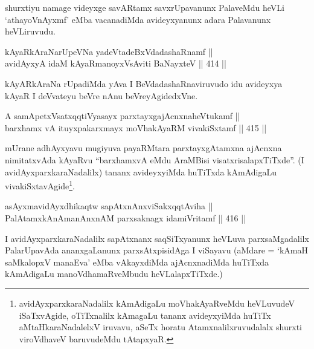 \begin{artha}
shurxtiyu namage videyxge savARtamx savxrUpavanunx PalaveMdu
heVLi `athayoV\s nAyxmf' eMba vacanadiMda avideyxyanunx adara Palavanunx
heVLiruvudu.
\end{artha}


\begin{shl}
kAyaRkAraNarUpeVNa yadeVtadeBxVdadashaRnamf || \\
avidAyxyA idaM kAyaRmanoyxV\s sAviti BaNayxteV \hfill || 414 ||  
\end{shl}

\begin{artha}
kAyARkAraNa rUpadiMda yAva I BeVdadashaRnaviruvudo idu avideyxya kAyaR
I deVvateyu beVre nAnu beVreyAgidedxVne.
\end{artha}


\begin{shl}
A samApetxVsatxqqtiVyasayx parxtayxgajAcnxnaheVtukamf || \\
barxhamx vA ituyxpakarxmayx moVhakAyaRM vivakiSxtamf \hfill || 415 ||  
\end{shl}

\begin{artha}
mUrane adhAyxyavu mugiyuva payaRMtara parxtayxgAtamxna ajAcnxna
nimitatxvAda kAyaRvu ``barxhamxvA eMdu AraMBisi
visatxrisalapxTiTxde''. (I avidAyxparxkaraNadalilx) tananx
avideyxyiMda huTiTxda kAmAdigaLu
vivakiSxtavAgide\footnote{avidAyxparxkaraNadalilx kAmAdigaLu
moVhakAyaRveMdu heVLuvudeV iSaTxvAgide, oTiTxnalilx kAmagaLu tananx
avideyxyiMda huTiTx aMtaHkaraNadalelxV iruvavu, aSeTx horatu
Atamxnalilxruvudalalx shurxti viroVdhaveV baruvudeMdu tAtapxyaR.}. 
\end{artha}

\begin{shl}
asAyxmavidAyxdhikaqtw sapAtxnAnxviSakxqqtAviha || \\
PalAtamxkAnAmanAnxnAM parxsaknagx idamiVritamf \hfill || 416 ||  
\end{shl}

\begin{artha}
I avidAyxparxkaraNadalilx sapAtxnanx saqSiTxyanunx heVLuva
parxsaMgadalilx PalarUpavAda ananxgaLanunx parxsAtxpisidAga I viSayavu
(aMdare = `kAmaH saMkalopxV \mdash   manaEva' eMba vAkayxdiMda
ajAcnxnadiMda huTiTxda kAmAdigaLu manoVdhamaRveMbudu heVLalapxTiTxde.)
\end{artha}

